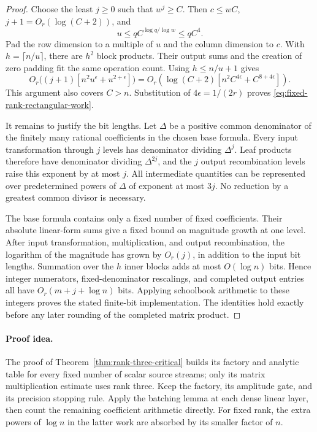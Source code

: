\begin{proof}
Choose the least $j\ge0$ such that $w^j\ge C$.
Then $c\le wC$, $j+1=O_r(\log(C+2))$, and
\[
 u\le q C^{\log q/\log w}\le qC^4.
\]
Pad the row dimension to a multiple of $u$ and the column dimension
to $c$. With $h=\lceil n/u\rceil$, there are $h^2$ block
products. Their output sums and the creation of zero padding fit the
same operation count. Using $h\le n/u+1$ gives
\[
 O_r\bigl((j+1)[n^2u^\epsilon+u^{2+\epsilon}]\bigr)
 =
 O_r\!\left(\log(C+2)
 [n^2C^{4\epsilon}+C^{8+4\epsilon}]\right).
\]
This argument also covers $C>n$. Substitution of
$4\epsilon=1/(2r)$ proves
\eqref{eq:fixed-rank-rectangular-work}.

It remains to justify the bit lengths. Let $\Delta$ be a positive
common denominator of the finitely many rational coefficients in the
chosen base formula. Every input transformation through $j$ levels
has denominator dividing $\Delta^j$. Leaf products therefore have
denominator dividing $\Delta^{2j}$, and the $j$ output
recombination levels raise this exponent by at most $j$.
All intermediate quantities can be represented over predetermined
powers of $\Delta$ of exponent at most $3j$.
No reduction by a greatest common divisor is necessary.

The base formula contains only a fixed number of fixed coefficients.
Their absolute linear-form sums give a fixed bound on magnitude
growth at one level. After input transformation, multiplication,
and output recombination, the logarithm of the magnitude has grown
by $O_r(j)$, in addition to the input bit lengths. Summation over
the $h$ inner blocks adds at most $O(\log n)$ bits. Hence integer
numerators, fixed-denominator rescalings, and completed output
entries all have $O_r(m+j+\log n)$ bits. Applying schoolbook
arithmetic to these integers proves the stated finite-bit
implementation. The identities hold exactly before any later
rounding of the completed matrix product.
\end{proof}

\paragraph{Proof idea.}
The proof of Theorem~\ref{thm:rank-three-critical} builds its factory
and analytic table for every fixed number of scalar source streams;
only its matrix multiplication estimate uses rank three. Keep the
factory, its amplitude gate, and its precision stopping rule. Apply
the batching lemma at each dense linear layer, then count the
remaining coefficient arithmetic directly. For fixed rank, the extra
powers of $\log n$ in the latter work are absorbed by its smaller
factor of $n$.

